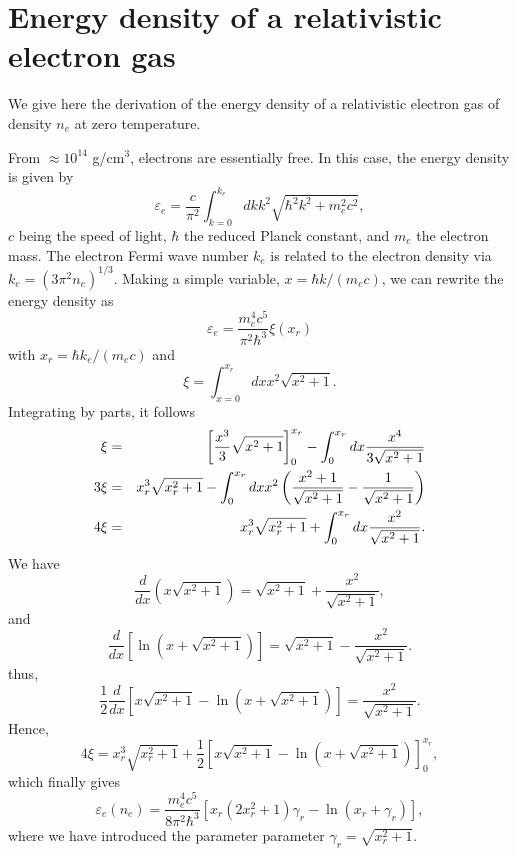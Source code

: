 \appendix
\chapter{Energy density of a relativistic electron gas}\label{appendix:epse}

We give here the derivation of the energy density of a relativistic electron
gas of density $n_e$ at zero temperature.

From $\approx 10^{14}$ g/cm$^3$, electrons are essentially free. In this
case, the energy density is given by
%
\begin{equation}
  \varepsilon_e = \frac{c}{\pi^2}\int_{k=0}^{k_{e}} dk k^2 
  \sqrt{\hbar^2 k^2 + m_e^2c^2},
\end{equation}
%
$c$ being the speed of light, $\hbar$ the reduced Planck constant, and $m_e$
the electron mass. The electron Fermi wave number $k_e$ is related to the
electron density via $k_e = (3\pi^2n_e)^{1/3}$. Making a simple variable, 
$x = \hbar k/(m_ec)$, we can rewrite the energy density as
%
\begin{equation}
  \varepsilon_e = \frac{m_e^4c^5}{\pi^2\hbar^3}\xi(x_r)
\end{equation}
%
with $x_r = \hbar k_e/(m_ec)$ and
%
\begin{equation}
  \xi = \int_{x=0}^{x_r} dx x^2\sqrt{x^2+1}.
\end{equation}
%
Integrating by parts, it follows
%
\begin{eqnarray}
  \xi &=& \left[\frac{x^3}{3}\sqrt{x^2 + 1}\right]_0^{x_r} -
  \int_0^{x_r}dx\frac{x^4}{3\sqrt{x^2+1}}\notag\\
  3\xi &=& x_r^3\sqrt{x_r^2+1} - \int_0^{x_r}dx x^2 \left(\frac{x^2+1}{\sqrt{x^2
  + 1}} - \frac{1}{\sqrt{x^2+1}}\right)\notag\\
        4\xi &=& x_r^3\sqrt{x_r^2+1} + \int_0^{x_r}dx \frac{x^2}{\sqrt{x^2+1}}.
\end{eqnarray}
%
We have
%
\begin{equation}
  \frac{d}{dx}\left(x\sqrt{x^2 + 1}\right) = \sqrt{x^2+1} + \frac{x^2}{\sqrt{x^2+1}},
\end{equation}
%
and
%
\begin{equation}
  \frac{d}{dx}\left[\ln(x + \sqrt{x^2+1})\right] = \sqrt{x^2+1} -
  \frac{x^2}{\sqrt{x^2+1}}.
\end{equation}
%
thus,
%
\begin{equation}
  \frac{1}{2}\frac{d}{dx}\left[x\sqrt{x^2+1} -
  \ln\left(x+\sqrt{x^2+1}\right)\right] = \frac{x^2}{\sqrt{x^2+1}}.
\end{equation}
%
Hence,
%
\begin{equation}
  4\xi = x_r^3\sqrt{x_r^2+1} + \frac{1}{2}\left[x\sqrt{x^2+1} -
  \ln\left(x+\sqrt{x^2+1}\right)\right]_0^{x_r},
\end{equation}
%
which finally gives
%
\begin{equation}
  \varepsilon_e(n_e) = \frac{m_e^4c^5}{8\pi^2\hbar^3}\left[x_r(2x_r^2 +
  1)\gamma_r - \ln(x_r + \gamma_r)\right], 
\end{equation}
%
where we have introduced the parameter parameter $\gamma_r = \sqrt{x_r^2+1}$.

